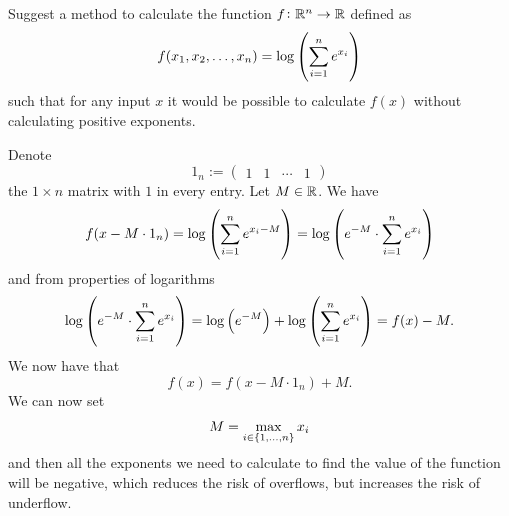 \documentclass[11pt, a4paper]{article}
\begin{document}
\begin{exercise}
  Suggest a method to calculate the function $f \colon \mathbb{R}^n \to \mathbb{R}$ defined as
  \[
    f(x_1,x_2,\dots,x_n) = \log\del{\sum_{i=1}^{n} e^{x_i}}
  \]
  such that for any input $x$ it would be possible to calculate $f(x)$
  without calculating positive exponents.
\end{exercise}
\begin{solution}
  Denote
  \[
    1_n :=
    \begin{pmatrix}
      1 & 1 & \cdots & 1
    \end{pmatrix}
  \]
  the $1 \times n$ matrix with $1$ in every entry.
  Let $M \in \mathbb{R}$.
  We have
  \[
    f(x - M \cdot 1_n) =
    \log\del{\sum_{i=1}^{n} e^{x_i- M}} =
    \log\del{e^{-M} \cdot \sum_{i=1}^{n} e^{x_i}}
  \]
  and from properties of logarithms
  \[
    \log\del{e^{-M} \cdot \sum_{i=1}^{n} e^{x_i}} =
    \log\del{e^{-M}} + \log\del{\sum_{i=1}^{n} e^{x_i}} =
    f(x) - M.
  \]
  We now have that
  \[
    f(x) = f(x - M \cdot 1_n) + M.
  \]
  We can now set
  \[
    M = \max_{i \in \left\{1,\dots,n\right\}} x_i
  \]
  and then all the exponents we need to calculate to find the value of the
  function will be negative, which reduces the risk of overflows, but
  increases the risk of underflow.
\end{solution}
\end{document}
